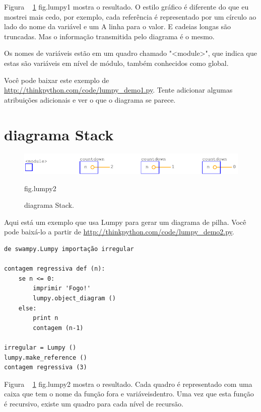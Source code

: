 \documentclass[10pt]{book}
\begin{document}
\begin{v erbatim}
{Figura ~ \ref {} fig.lumpy1 mostra o resultado. O estilo gráfico é
diferente do que eu mostrei mais cedo, por exemplo, cada
referência é representado por um círculo ao lado do nome da variável e um
A linha para o valor. E cadeias longas são truncadas. Mas o
informação transmitida pelo diagrama é o mesmo.

Os nomes de variáveis ​​estão em um quadro chamado \verbo "<module>", que
indica que estas são variáveis ​​em nível de módulo, também conhecidos como
global.

Você pode baixar este exemplo de
\url{http://thinkpython.com/code/lumpy_demo1.py}. Tente adicionar algumas
atribuições adicionais e ver o que o diagrama se parece.


\section{diagrama Stack}

\begin{figure}
\centerline
{\includegraphics[scale = 0.7] {figs/lumpydemo2.pdf}}
\caption{diagrama Stack.}
\label{} fig.lumpy2
\end{figure}

Aqui está um exemplo que usa Lumpy para gerar um diagrama de pilha.
Você pode baixá-lo a partir de \url{http://thinkpython.com/code/lumpy_demo2.py}.
 

\begin{verbatim}
de swampy.Lumpy importação irregular

contagem regressiva def (n):
    se n <= 0:
        imprimir 'Fogo!'
        lumpy.object_diagram ()
    else:
        print n
        contagem (n-1)

irregular = Lumpy ()
lumpy.make_reference ()
contagem regressiva (3)
\end{verbatim}

Figura ~ \ref {} fig.lumpy2 mostra o resultado. Cada quadro é representado
com uma caixa que tem o nome da função fora e variáveis ​​dentro.
Uma vez que esta função é recursivo, existe um quadro para cada
nível de recursão.

}
\end{v erbatim}
\end{document}
